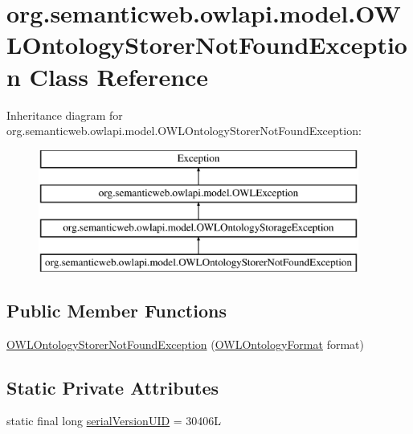 \hypertarget{classorg_1_1semanticweb_1_1owlapi_1_1model_1_1_o_w_l_ontology_storer_not_found_exception}{\section{org.\-semanticweb.\-owlapi.\-model.\-O\-W\-L\-Ontology\-Storer\-Not\-Found\-Exception Class Reference}
\label{classorg_1_1semanticweb_1_1owlapi_1_1model_1_1_o_w_l_ontology_storer_not_found_exception}
}
Inheritance diagram for org.\-semanticweb.\-owlapi.\-model.\-O\-W\-L\-Ontology\-Storer\-Not\-Found\-Exception\-:\begin{figure}[H]
\begin{center}
\leavevmode
\includegraphics[height=4.000000cm]{classorg_1_1semanticweb_1_1owlapi_1_1model_1_1_o_w_l_ontology_storer_not_found_exception}
\end{center}
\end{figure}
\subsection*{Public Member Functions}
\begin{DoxyCompactItemize}
\item 
\hyperlink{classorg_1_1semanticweb_1_1owlapi_1_1model_1_1_o_w_l_ontology_storer_not_found_exception_af758504e2d531a301082c2202c6e7092}{O\-W\-L\-Ontology\-Storer\-Not\-Found\-Exception} (\hyperlink{classorg_1_1semanticweb_1_1owlapi_1_1model_1_1_o_w_l_ontology_format}{O\-W\-L\-Ontology\-Format} format)
\end{DoxyCompactItemize}
\subsection*{Static Private Attributes}
\begin{DoxyCompactItemize}
\item 
static final long \hyperlink{classorg_1_1semanticweb_1_1owlapi_1_1model_1_1_o_w_l_ontology_storer_not_found_exception_a3ab346f34e96cfabd03de25a4c321a96}{serial\-Version\-U\-I\-D} = 30406\-L
\end{DoxyCompactItemize}
